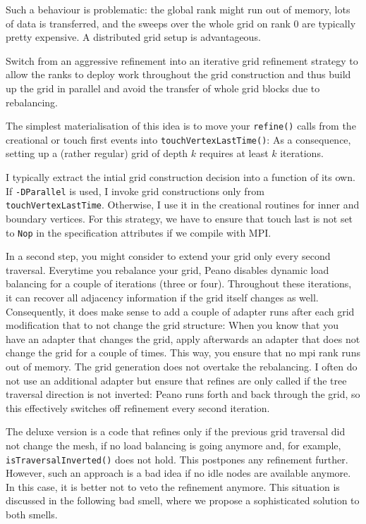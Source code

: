 Such a behaviour is problematic: the global rank might run out of memory, lots
of data is transferred, and the sweeps over the whole grid on rank 0 are
typically pretty expensive. 
A distributed grid setup is advantageous.

\begin{solution}
Switch from an aggressive
refinement into an iterative grid refinement strategy to allow the ranks to
deploy work throughout the grid construction and thus build up the grid in parallel and avoid the transfer of whole grid
blocks due to rebalancing.
\end{solution}

\noindent
The simplest materialisation of this idea is to 
move your \texttt{refine()} calls from the creational or touch first
events into \texttt{touchVertexLastTime()}:
As a consequence, setting up a (rather regular) grid of depth $k$ requires at
least $k$ iterations.

\begin{remark}
 I typically extract the intial grid construction decision into a function of 
 its own. If \texttt{-DParallel} is used, I invoke grid constructions only 
 from \texttt{touchVertexLastTime}. Otherwise, I use it in the creational 
 routines for inner and boundary vertices. For this strategy, we have to ensure
 that touch last is not set to \texttt{Nop} in the specification attributes if
 we compile with MPI.
\end{remark}

In a second step, you might consider to extend your grid only every second
traversal.
Everytime you rebalance your grid, Peano disables dynamic load balancing
for a couple of iterations (three or four). Throughout these iterations, it
can recover all adjacency information if the grid itself changes as well.
Consequently, it does make sense to add a couple of adapter runs after each
grid modification that to not change the grid structure: When you know that
you have an adapter that changes the grid, apply afterwards an adapter that
does not change the grid for a couple of times. This way, you ensure that no
mpi rank runs out of memory. The grid generation does not overtake the rebalancing.
I often do not use an additional adapter but ensure that refines are only called
if the tree traversal direction is not inverted: 
Peano runs forth and back through the grid, so this effectively switches off
refinement every second iteration. 

The deluxe version is a code that refines only if the previous grid traversal
did not change the mesh, if no load balancing is going anymore and, for example,
\texttt{isTraversalInverted()} does not hold. This postpones any refinement
further.
However, such an approach is a bad idea if no idle nodes are available anymore. 
In this case, it is better not to veto the refinement anymore.
This situation is discussed in the following bad smell, where we propose a
sophisticated solution to both smells.



